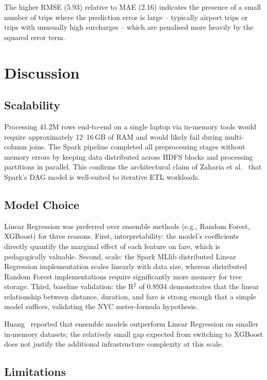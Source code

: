 \documentclass[conference]{IEEEtran}
\begin{document}
The higher RMSE (5.93) relative to MAE (2.16) indicates the
presence of a small number of trips where the prediction
error is large -- typically airport trips or trips with
unusually high surcharges -- which are penalised more heavily
by the squared error term.

\section{Discussion}
\label{sec:discussion}

\subsection{Scalability}

Processing 41.2M rows end-to-end on a single laptop via
in-memory tools would require approximately 12--16\,GB of RAM
and would likely fail during multi-column joins. The Spark
pipeline completed all preprocessing stages without memory
errors by keeping data distributed across HDFS blocks and
processing partitions in parallel. This confirms the
architectural claim of Zaharia et al.~\cite{zaharia2016apache}
that Spark's DAG model is well-suited to iterative ETL
workloads.

\subsection{Model Choice}

Linear Regression was preferred over ensemble methods
(e.g., Random Forest, XGBoost) for three reasons. First,
interpretability: the model's coefficients directly quantify
the marginal effect of each feature on fare, which is
pedagogically valuable. Second, scale: the Spark MLlib
distributed Linear Regression implementation scales linearly
with data size, whereas distributed Random Forest
implementations require significantly more memory for tree
storage. Third, baseline validation: the R$^{2}$ of 0.8934
demonstrates that the linear relationship between distance,
duration, and fare is strong enough that a simple model
suffices, validating the NYC meter-formula hypothesis.

Huang~\cite{huang2023taxi} reported that ensemble models
outperform Linear Regression on smaller in-memory datasets;
the relatively small gap expected from switching to XGBoost
does not justify the additional infrastructure complexity at
this scale.

\subsection{Limitations}
\end{document}
